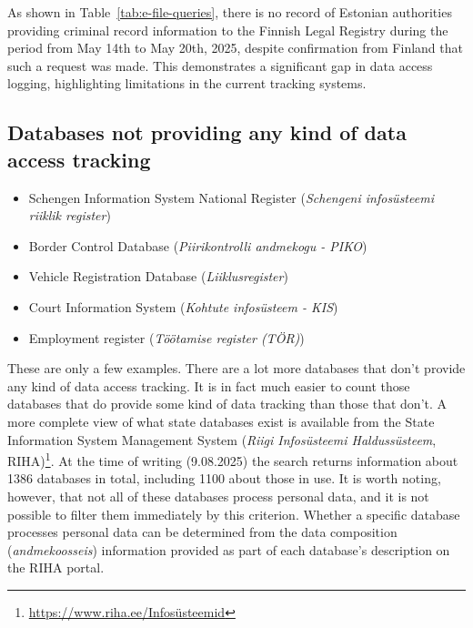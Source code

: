 As shown in Table~\ref{tab:e-file-queries}, there is no record of Estonian authorities providing criminal record information to the Finnish Legal Registry during the period from May 14th to May 20th, 2025, despite confirmation from Finland that such a request was made. This demonstrates a significant gap in data access logging, highlighting limitations in the current tracking systems.


\subsection{Databases not providing any kind of data access tracking}
\begin{itemize}
    \item Schengen Information System National Register (\textit{Schengeni infosüsteemi riiklik register})
    \item Border Control Database (\textit{Piirikontrolli andmekogu - PIKO})
    \item Vehicle Registration Database (\textit{Liiklusregister})
    \item Court Information System (\textit{Kohtute infosüsteem - KIS})
    \item Employment register (\textit{Töötamise register (TÖR)})

\end{itemize}

These are only a few examples. There are a lot more databases that don't provide any kind of data access tracking. It is in fact much easier to count those databases that do provide some kind of data tracking than those that don't. A more complete view of what state databases exist is available from the State Information System Management System (\textit{Riigi Infosüsteemi Haldussüsteem}, RIHA)\footnote{\url{https://www.riha.ee/Infosüsteemid}}. At the time of writing (9.08.2025) the search returns information about 1386 databases in total, including 1100 about those in use. It is worth noting, however, that not all of these databases process personal data, and it is not possible to filter them immediately by this criterion. Whether a specific database processes personal data can be determined from the data composition (\textit{andmekoosseis}) information provided as part of each database's description on the RIHA portal.


